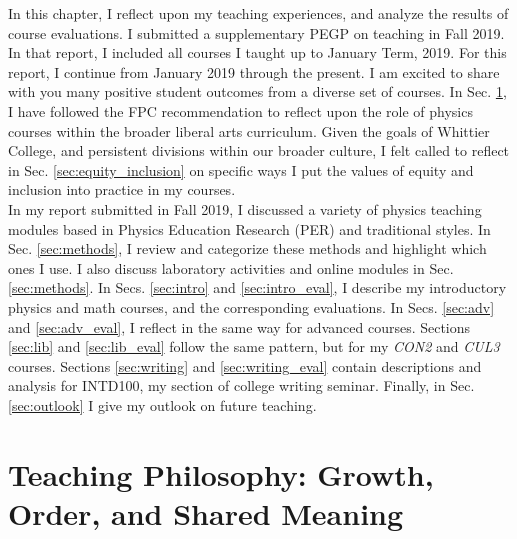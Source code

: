 \documentclass[../../main.tex]{subfiles}
\begin{document}
\label{sec:teaching}

In this chapter, I reflect upon my teaching experiences, and analyze the results of course evaluations.  I submitted a supplementary PEGP on teaching in Fall 2019.  In that report, I included all courses I taught up to January Term, 2019.  For this report, I continue from January 2019 through the present.  I am excited to share with you many positive student outcomes from a diverse set of courses.  In Sec. \ref{sec:teaching_philosophy}, I have followed the FPC recommendation to reflect upon the role of physics courses within the broader liberal arts curriculum.  Given the goals of Whittier College, and persistent divisions within our broader culture, I felt called to reflect in Sec. \ref{sec:equity_inclusion} on specific ways I put the values of equity and inclusion into practice in my courses.
\\
\vspace{0.25cm}
In my report submitted in Fall 2019, I discussed a variety of physics teaching modules based in Physics Education Research (PER) and traditional styles.  In Sec. \ref{sec:methods}, I review and categorize these methods and highlight which ones I use.  I also discuss laboratory activities and online modules in Sec. \ref{sec:methods}.  In Secs. \ref{sec:intro} and \ref{sec:intro_eval}, I describe my introductory physics and math courses, and the corresponding evaluations.  In Secs. \ref{sec:adv} and \ref{sec:adv_eval}, I reflect in the same way for advanced courses.  Sections \ref{sec:lib} and \ref{sec:lib_eval} follow the same pattern, but for my \textit{CON2} and \textit{CUL3} courses.  Sections \ref{sec:writing} and \ref{sec:writing_eval} contain descriptions and analysis for INTD100, my section of college writing seminar.  Finally, in Sec. \ref{sec:outlook} I give my outlook on future teaching.

\section{Teaching Philosophy: Growth, Order, and Shared Meaning}
\label{sec:teaching_philosophy}

%

\begin{flushleft}

\end{flushleft}
\end{document}
